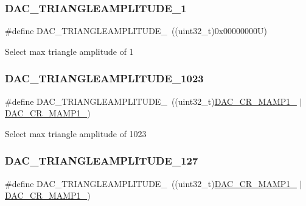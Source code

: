 \subsubsection{\texorpdfstring{DAC\_TRIANGLEAMPLITUDE\_1}{DAC\_TRIANGLEAMPLITUDE\_1}}
{\footnotesize\ttfamily \#define D\+A\+C\+\_\+\+T\+R\+I\+A\+N\+G\+L\+E\+A\+M\+P\+L\+I\+T\+U\+D\+E\+\_~((uint32\+\_\+t)0x00000000\+U)}

Select max triangle amplitude of 1 \mbox{\label{group___d_a_c_ex__lfsrunmask__triangleamplitude_ga0302e3294e47d56bd8ccf3c1f9666b67}} 
\subsubsection{\texorpdfstring{DAC\_TRIANGLEAMPLITUDE\_1023}{DAC\_TRIANGLEAMPLITUDE\_1023}}
{\footnotesize\ttfamily \#define D\+A\+C\+\_\+\+T\+R\+I\+A\+N\+G\+L\+E\+A\+M\+P\+L\+I\+T\+U\+D\+E\+\_~((uint32\+\_\+t)\mbox{\hyperlink{group___peripheral___registers___bits___definition_gafdc83b4feb742c632ba66f55d102432b}{D\+A\+C\+\_\+\+C\+R\+\_\+\+M\+A\+M\+P1\+\_}} $\vert$ \mbox{\hyperlink{group___peripheral___registers___bits___definition_ga4225dcce22b440fcd3a8ad96c5f2baec}{D\+A\+C\+\_\+\+C\+R\+\_\+\+M\+A\+M\+P1\+\_}})}

Select max triangle amplitude of 1023 \mbox{\label{group___d_a_c_ex__lfsrunmask__triangleamplitude_ga9592f254a8231d140002c513797a4010}} 
\subsubsection{\texorpdfstring{DAC\_TRIANGLEAMPLITUDE\_127}{DAC\_TRIANGLEAMPLITUDE\_127}}
{\footnotesize\ttfamily \#define D\+A\+C\+\_\+\+T\+R\+I\+A\+N\+G\+L\+E\+A\+M\+P\+L\+I\+T\+U\+D\+E\+\_~((uint32\+\_\+t)\mbox{\hyperlink{group___peripheral___registers___bits___definition_ga0fefef1d798a2685b03e44bd9fdac06b}{D\+A\+C\+\_\+\+C\+R\+\_\+\+M\+A\+M\+P1\+\_}} $\vert$ \mbox{\hyperlink{group___peripheral___registers___bits___definition_ga6cc15817842cb7992d449c448684f68d}{D\+A\+C\+\_\+\+C\+R\+\_\+\+M\+A\+M\+P1\+\_}})}

